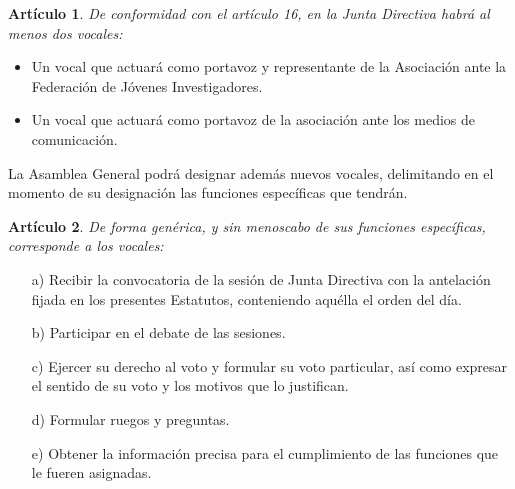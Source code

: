 \documentclass[a4paper,12pt]{article}
\theoremstyle{mystyle}		%
\newtheorem{art}{Artículo}	%
\begin{document}
\begin{onehalfspace}
\begin{art}
De conformidad con el artículo 16, en la Junta Directiva habrá al menos dos vocales:
\end{art}
\begin{itemize}
\item  Un vocal que actuará como portavoz y representante de la Asociación ante la Federación de Jóvenes Investigadores.
\item  Un vocal que actuará como portavoz de la asociación ante los medios de comunicación.
\end{itemize}

La Asamblea General podrá designar además nuevos vocales, delimitando en el momento de su designación las funciones específicas que tendrán.

\begin{art}
De forma genérica, y sin menoscabo de sus funciones específicas, corresponde a los vocales:
\end{art}
\begin{itemize}
\item [a)] Recibir la convocatoria de la sesión de Junta Directiva con la antelación fijada en los presentes Estatutos, conteniendo aquélla el orden del día.
\item [b)] Participar en el debate de las sesiones.
\item [c)] Ejercer su derecho al voto y formular su voto particular, así como expresar el sentido de su voto y los motivos que lo justifican.
\item [d)] Formular ruegos y preguntas.
\item [e)] Obtener la información precisa para el cumplimiento de las funciones que le fueren asignadas.
\end{itemize}


\end{onehalfspace}
\end{document}
